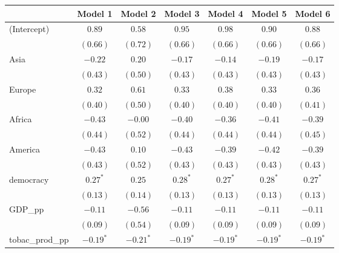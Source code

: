 
\begin{table}[!h]
\begin{center}
\begin{tabular}{l c c c c c c }
\toprule
 & Model 1 & Model 2 & Model 3 & Model 4 & Model 5 & Model 6 \\
\midrule
(Intercept)             & $0.89$       & $0.58$       & $0.95$       & $0.98$       & $0.90$       & $0.88$       \\
                        & $(0.66)$     & $(0.72)$     & $(0.66)$     & $(0.66)$     & $(0.66)$     & $(0.66)$     \\
Asia                    & $-0.22$      & $0.20$       & $-0.17$      & $-0.14$      & $-0.19$      & $-0.17$      \\
                        & $(0.43)$     & $(0.50)$     & $(0.43)$     & $(0.43)$     & $(0.43)$     & $(0.43)$     \\
Europe                  & $0.32$       & $0.61$       & $0.33$       & $0.38$       & $0.33$       & $0.36$       \\
                        & $(0.40)$     & $(0.50)$     & $(0.40)$     & $(0.40)$     & $(0.40)$     & $(0.41)$     \\
Africa                  & $-0.43$      & $-0.00$      & $-0.40$      & $-0.36$      & $-0.41$      & $-0.39$      \\
                        & $(0.44)$     & $(0.52)$     & $(0.44)$     & $(0.44)$     & $(0.44)$     & $(0.45)$     \\
America                 & $-0.43$      & $0.10$       & $-0.43$      & $-0.39$      & $-0.42$      & $-0.39$      \\
                        & $(0.43)$     & $(0.52)$     & $(0.43)$     & $(0.43)$     & $(0.43)$     & $(0.43)$     \\
democracy               & $0.27^{*}$   & $0.25$       & $0.28^{*}$   & $0.27^{*}$   & $0.28^{*}$   & $0.27^{*}$   \\
                        & $(0.13)$     & $(0.14)$     & $(0.13)$     & $(0.13)$     & $(0.13)$     & $(0.13)$     \\
GDP\_pp                 & $-0.11$      & $-0.56$      & $-0.11$      & $-0.11$      & $-0.11$      & $-0.11$      \\
                        & $(0.09)$     & $(0.54)$     & $(0.09)$     & $(0.09)$     & $(0.09)$     & $(0.09)$     \\
tobac\_prod\_pp         & $-0.19^{*}$  & $-0.21^{*}$  & $-0.19^{*}$  & $-0.19^{*}$  & $-0.19^{*}$  & $-0.19^{*}$  \\

\end{tabular}
\end{center}
\end{table}
